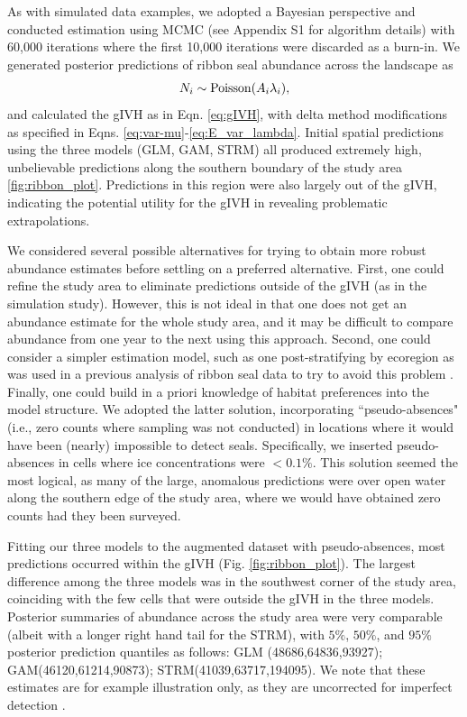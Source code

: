 \documentclass[12pt,english]{article}
\begin{document}
\begin{spacing}{1.9}
As with simulated data examples, we adopted a Bayesian perspective and conducted estimation using MCMC (see Appendix S1 for algorithm details) with 60,000 iterations where the first 10,000 iterations were discarded as a burn-in.  We generated posterior predictions of ribbon seal abundance across the landscape as
\begin{equation}
  N_i \sim {\rm Poisson}(A_i \lambda_i),
\end{equation}
and calculated the gIVH as in Eqn. \ref{eq:gIVH}, with delta method modifications as specified in Eqns. \ref{eq:var-mu}-\ref{eq:E_var_lambda}.
Initial spatial predictions using the three models (GLM, GAM, STRM) all produced extremely high, unbelievable predictions along the southern boundary of the study area \ref{fig:ribbon_plot}.  Predictions in this region were also largely out of the gIVH, indicating the potential utility for the gIVH in revealing problematic extrapolations.

We considered several possible alternatives for trying to obtain more robust abundance estimates before settling on a preferred alternative.  First, one could refine the study area to eliminate predictions outside of the gIVH (as in the simulation study).  However, this is not ideal in that one does not get an abundance estimate for the whole study area, and it may be difficult to compare abundance from one year to the next using this approach. Second, one could consider a simpler estimation model, such as one post-stratifying by ecoregion as was used in a previous analysis of ribbon seal data to try to avoid this problem \citep{ConnEtAl2014}.  Finally, one could build in a priori knowledge of habitat preferences into the model structure.  We adopted the latter solution, incorporating ``pseudo-absences" (i.e., zero counts where sampling was not conducted) in locations where it would have been (nearly) impossible to detect seals.  Specifically, we inserted pseudo-absences in cells where ice concentrations were $<0.1\%$.  This solution seemed the most logical, as many of the large, anomalous predictions were over open water along the southern edge of the study area, where we would have obtained zero counts had they been surveyed.

Fitting our three models to the augmented dataset with pseudo-absences, most predictions occurred within the gIVH (Fig. \ref{fig:ribbon_plot}).  The largest difference among the three models was in the southwest corner of the study area, coinciding with the few cells that were outside the gIVH in the three models.  Posterior summaries of abundance across the study area were very comparable (albeit with a longer right hand tail for the STRM), with $5\%$, $50\%$, and $95\%$ posterior prediction quantiles as follows: GLM (48686,64836,93927); GAM(46120,61214,90873); STRM(41039,63717,194095).  We note that these estimates are for example illustration only, as they are uncorrected for imperfect detection \citep[e.g., incomplete detection of thermal cameras, animals that were unavailable for sampling because they were in the water, species misidentification; see][]{ConnEtAl2014}.




\end{spacing}
\end{document}

